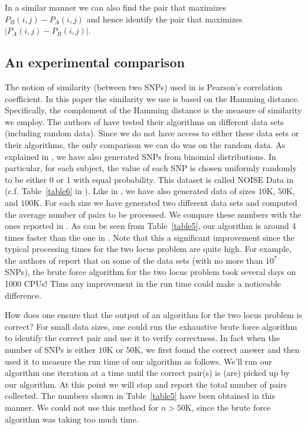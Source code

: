 \documentclass{article}
\theoremstyle{definition}
\theoremstyle{remark}
\begin{document}
 In a similar manner we can also find the pair that maximizes $P_B(i,j)-P_A(i,j)$ and hence identify the pair that maximizes $|P_A(i,j)-P_B(i,j)|$.
\subsection{An experimental comparison}
The notion of similarity (between two SNPs) used in \cite{PBK11} is Pearson's correlation coefficient. In this paper the similarity we use is based on the Hamming distance.  Specifically, the complement of the Hamming distance is the measure of similarity we employ.
The authors of \cite{PBK11} have tested their algorithms on different data sets (including random data). Since we do not have access to either these data sets or their algorithms, the only comparison we can do was on the random data. As explained in \cite{PBK11}, we have also generated SNPs from binomial distributions. In particular, for each subject, the value of each SNP is chosen uniformly randomly to be either 0 or 1 with equal probability. This dataset is called NOISE Data in \cite{PBK11} (c.f. Table~\ref{table6} in \cite{PBK11}).  Like in \cite{PBK11}, we have also generated data of sizes $10$K, $50$K, and $100$K. For each size we have generated two different data sets and computed the average number of pairs to be processed. We compare these numbers with the ones reported in \cite{PBK11}. As can be seen from Table~\ref{table5}, our algorithm is around 4 times faster than the one in \cite{PBK11}. Note that this a significant improvement since the typical processing times for the two locus problem are quite high. For example, the authors of \cite{PBK11} report that on some of the data sets (with no more than $10^7$ SNPs), the brute force algorithm for the two locus problem took several days on 1000 CPUs! Thus any improvement in the run time could make a noticeable difference.

How does one ensure that the output of an algorithm for the two locus problem is correct? For small data sizes, one could run the exhaustive brute force algorithm to identify the correct pair and use it to verify correctness. In fact when the number of SNPs is either $10$K or $50$K, we first found the correct answer and then used it to measure the run time of our algorithm as follows. We'll run our algorithm one iteration at a time until the correct pair(s) is (are) picked up by our algorithm. At this point we will stop and report the total number of pairs collected. The numbers shown in Table~\ref{table5} have been obtained in this manner. We could not use this method for $n>50$K, since the brute force algorithm was taking too much time.
\end{document}
